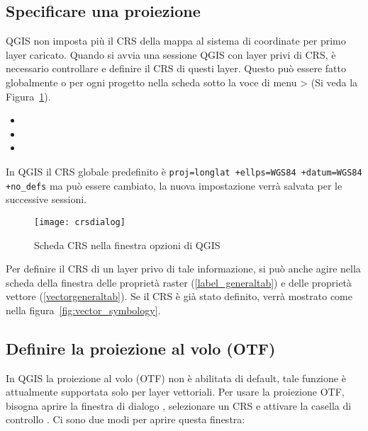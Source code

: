 \subsection{Specificare una proiezione}
\label{sec:projection-specifying}

QGIS non imposta più il CRS della mappa al sistema di coordinate per primo
layer caricato. Quando si avvia una sessione QGIS con layer privi di CRS,
è necessario controllare e definire il CRS di questi layer. Questo può
essere fatto globalmente o per ogni progetto nella scheda  sotto
la voce di menu  >
 (Si veda la Figura~\ref{fig:crsdialog}). 

\begin{itemize}
\item {} 
\item {}
\item {}
\end{itemize}

In QGIS il CRS globale predefinito è \texttt{proj=longlat +ellps=WGS84 +datum=WGS84
+no\_defs} ma può essere cambiato, la nuova impostazione verrà salvata per le
successive sessioni.

\begin{figure}[ht]
   \begin{center}
   \caption{Scheda CRS nella finestra opzioni di QGIS \nixcaption}\label{fig:crsdialog}\smallskip
   \texttt{[image: crsdialog]}
\end{center}
\end{figure}

Per definire il CRS di un layer privo di tale informazione, si può anche agire
nella scheda  della finestra delle proprietà raster (\ref{label_generaltab})
e delle proprietà vettore (\ref{vectorgeneraltab}). Se il CRS è già stato
definito, verrà mostrato come nella figura~\ref{fig:vector_symbology}.

\subsection{Definire la proiezione al volo (OTF)}\label{label_projstart}

In QGIS la proiezione al volo (OTF) non è abilitata di default, tale funzione
è attualmente supportata solo per layer vettoriali. Per usare la proiezione OTF,
bisogna aprire la finestra di dialogo
, selezionare un CRS
e attivare la casella di controllo .
Ci sono due modi per aprire questa finestra:

